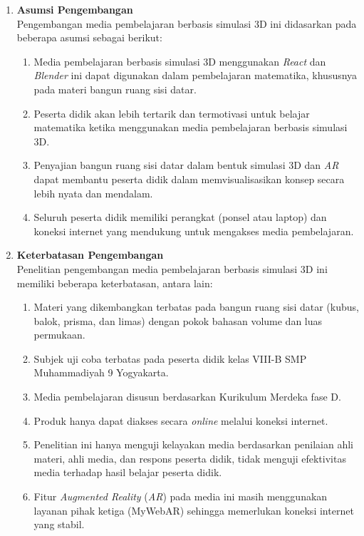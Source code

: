\begin{enumerate}
    \item \textbf{Asumsi Pengembangan} \\
    Pengembangan media pembelajaran berbasis simulasi 3D ini didasarkan pada beberapa asumsi sebagai berikut:
    \begin{enumerate}
        \item Media pembelajaran berbasis simulasi 3D menggunakan \textit{React} dan \textit{Blender} ini dapat digunakan dalam pembelajaran matematika, khususnya pada materi bangun ruang sisi datar.
        \item Peserta didik akan lebih tertarik dan termotivasi untuk belajar matematika ketika menggunakan media pembelajaran berbasis simulasi 3D.
        \item Penyajian bangun ruang sisi datar dalam bentuk simulasi 3D dan \textit{AR} dapat membantu peserta didik dalam memvisualisasikan konsep secara lebih nyata dan mendalam.
        \item Seluruh peserta didik memiliki perangkat (ponsel atau laptop) dan koneksi internet yang mendukung untuk mengakses media pembelajaran.
    \end{enumerate}

    \item \textbf{Keterbatasan Pengembangan} \\
    Penelitian pengembangan media pembelajaran berbasis simulasi 3D ini memiliki beberapa keterbatasan, antara lain:
    \begin{enumerate}
        \item Materi yang dikembangkan terbatas pada bangun ruang sisi datar (kubus, balok, prisma, dan limas) dengan pokok bahasan volume dan luas permukaan.
        \item Subjek uji coba terbatas pada peserta didik kelas VIII-B SMP Muhammadiyah 9 Yogyakarta.
        \item Media pembelajaran disusun berdasarkan Kurikulum Merdeka fase D.
        \item Produk hanya dapat diakses secara \textit{online} melalui koneksi internet.
        \item Penelitian ini hanya menguji kelayakan media berdasarkan penilaian ahli materi, ahli media, dan respons peserta didik, tidak menguji efektivitas media terhadap hasil belajar peserta didik.
        \item Fitur \textit{Augmented Reality} (\textit{AR}) pada media ini masih menggunakan layanan pihak ketiga (MyWebAR) sehingga memerlukan koneksi internet yang stabil.
    \end{enumerate}
\end{enumerate}

